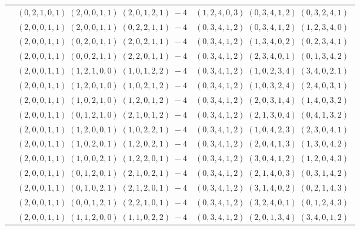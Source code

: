 \documentclass[11pt]{article}
\begin{document}
\begin{longtable}[l]{|c|c|c|}
 \cline{2-3} 
 & $(0 ,2 ,1 ,0 ,1) \;(2 ,0 ,0 ,1 ,1) \;(2 ,0 ,1 ,2 ,1) \;-4$ & $(1 ,2 ,4 ,0 ,3) \;(0 ,3 ,4 ,1 ,2) \;(0 ,3 ,2 ,4 ,1) \;$\\ 
 \cline{2-3} 
 & $(2 ,0 ,0 ,1 ,1) \;(2 ,0 ,0 ,1 ,1) \;(0 ,2 ,2 ,1 ,1) \;-4$ & $(0 ,3 ,4 ,1 ,2) \;(0 ,3 ,4 ,1 ,2) \;(1 ,2 ,3 ,4 ,0) \;$\\ 
 \cline{2-3} 
 & $(2 ,0 ,0 ,1 ,1) \;(0 ,2 ,0 ,1 ,1) \;(2 ,0 ,2 ,1 ,1) \;-4$ & $(0 ,3 ,4 ,1 ,2) \;(1 ,3 ,4 ,0 ,2) \;(0 ,2 ,3 ,4 ,1) \;$\\ 
 \cline{2-3} 
 & $(2 ,0 ,0 ,1 ,1) \;(0 ,0 ,2 ,1 ,1) \;(2 ,2 ,0 ,1 ,1) \;-4$ & $(0 ,3 ,4 ,1 ,2) \;(2 ,3 ,4 ,0 ,1) \;(0 ,1 ,3 ,4 ,2) \;$\\ 
 \cline{2-3} 
 & $(2 ,0 ,0 ,1 ,1) \;(1 ,2 ,1 ,0 ,0) \;(1 ,0 ,1 ,2 ,2) \;-4$ & $(0 ,3 ,4 ,1 ,2) \;(1 ,0 ,2 ,3 ,4) \;(3 ,4 ,0 ,2 ,1) \;$\\ 
 \cline{2-3} 
 & $(2 ,0 ,0 ,1 ,1) \;(1 ,2 ,0 ,1 ,0) \;(1 ,0 ,2 ,1 ,2) \;-4$ & $(0 ,3 ,4 ,1 ,2) \;(1 ,0 ,3 ,2 ,4) \;(2 ,4 ,0 ,3 ,1) \;$\\ 
 \cline{2-3} 
 & $(2 ,0 ,0 ,1 ,1) \;(1 ,0 ,2 ,1 ,0) \;(1 ,2 ,0 ,1 ,2) \;-4$ & $(0 ,3 ,4 ,1 ,2) \;(2 ,0 ,3 ,1 ,4) \;(1 ,4 ,0 ,3 ,2) \;$\\ 
 \cline{2-3} 
 & $(2 ,0 ,0 ,1 ,1) \;(0 ,1 ,2 ,1 ,0) \;(2 ,1 ,0 ,1 ,2) \;-4$ & $(0 ,3 ,4 ,1 ,2) \;(2 ,1 ,3 ,0 ,4) \;(0 ,4 ,1 ,3 ,2) \;$\\ 
 \cline{2-3} 
 & $(2 ,0 ,0 ,1 ,1) \;(1 ,2 ,0 ,0 ,1) \;(1 ,0 ,2 ,2 ,1) \;-4$ & $(0 ,3 ,4 ,1 ,2) \;(1 ,0 ,4 ,2 ,3) \;(2 ,3 ,0 ,4 ,1) \;$\\ 
 \cline{2-3} 
 & $(2 ,0 ,0 ,1 ,1) \;(1 ,0 ,2 ,0 ,1) \;(1 ,2 ,0 ,2 ,1) \;-4$ & $(0 ,3 ,4 ,1 ,2) \;(2 ,0 ,4 ,1 ,3) \;(1 ,3 ,0 ,4 ,2) \;$\\ 
 \cline{2-3} 
 & $(2 ,0 ,0 ,1 ,1) \;(1 ,0 ,0 ,2 ,1) \;(1 ,2 ,2 ,0 ,1) \;-4$ & $(0 ,3 ,4 ,1 ,2) \;(3 ,0 ,4 ,1 ,2) \;(1 ,2 ,0 ,4 ,3) \;$\\ 
 \cline{2-3} 
 & $(2 ,0 ,0 ,1 ,1) \;(0 ,1 ,2 ,0 ,1) \;(2 ,1 ,0 ,2 ,1) \;-4$ & $(0 ,3 ,4 ,1 ,2) \;(2 ,1 ,4 ,0 ,3) \;(0 ,3 ,1 ,4 ,2) \;$\\ 
 \cline{2-3} 
 & $(2 ,0 ,0 ,1 ,1) \;(0 ,1 ,0 ,2 ,1) \;(2 ,1 ,2 ,0 ,1) \;-4$ & $(0 ,3 ,4 ,1 ,2) \;(3 ,1 ,4 ,0 ,2) \;(0 ,2 ,1 ,4 ,3) \;$\\ 
 \cline{2-3} 
 & $(2 ,0 ,0 ,1 ,1) \;(0 ,0 ,1 ,2 ,1) \;(2 ,2 ,1 ,0 ,1) \;-4$ & $(0 ,3 ,4 ,1 ,2) \;(3 ,2 ,4 ,0 ,1) \;(0 ,1 ,2 ,4 ,3) \;$\\ 
 \cline{2-3} 
 & $(2 ,0 ,0 ,1 ,1) \;(1 ,1 ,2 ,0 ,0) \;(1 ,1 ,0 ,2 ,2) \;-4$ & $(0 ,3 ,4 ,1 ,2) \;(2 ,0 ,1 ,3 ,4) \;(3 ,4 ,0 ,1 ,2) \;$\\ 

\end{longtable}
\end{document}
